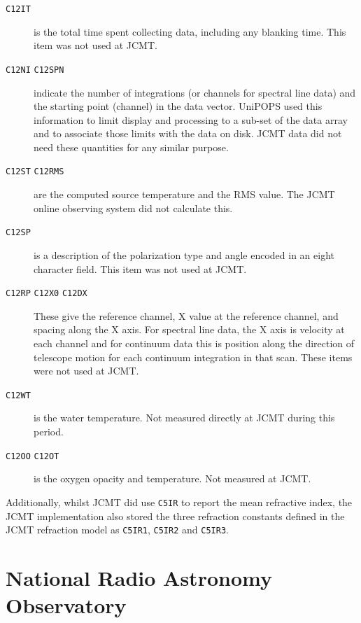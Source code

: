 \documentclass[final,authoryear,5p,times,twocolumn]{elsarticle}
\begin{document}
\begin{description}
\item[\texttt{C12IT}] is the total time spent collecting data, 
  including any blanking time.  This item was not used at JCMT.

\item[\texttt{C12NI} \texttt{C12SPN}] indicate the number of integrations (or
  channels for spectral line data) and the starting point (channel) in the data vector.
  UniPOPS used this information to limit display and processing to a sub-set of the 
  data array and to associate those limits with the data on disk. 
  JCMT data did not need these quantities for any 
  similar purpose.

\item[\texttt{C12ST} \texttt{C12RMS}] are the computed source
  temperature and the RMS value. The JCMT online observing system did
  not calculate this.

\item[\texttt{C12SP}] is a description of the polarization type and
  angle encoded in an eight character field. This item was not used at
  JCMT.

\item[\texttt{C12RP} \texttt{C12X0} \texttt{C12DX}] These give the
  reference channel, X value at the reference channel, and spacing along
  the X axis.  For spectral line data, the X axis is velocity at
  each channel and for continuum data this is position along the
  direction of telescope motion for each continuum integration in
  that scan.  These items were not used at JCMT.

\item[\texttt{C12WT}] is the water temperature. Not measured directly
  at JCMT during this period.

\item[\texttt{C12OO} \texttt{C12OT}] is the oxygen opacity and
  temperature. Not measured at JCMT.

\end{description}

Additionally, whilst JCMT did use \texttt{C5IR} to report the mean
refractive index, the JCMT implementation also stored the three refraction constants
defined in the JCMT refraction model \citep{mtin26} as \texttt{C5IR1}, \texttt{C5IR2}
and \texttt{C5IR3}.

\section{National Radio Astronomy Observatory}
\end{document}

